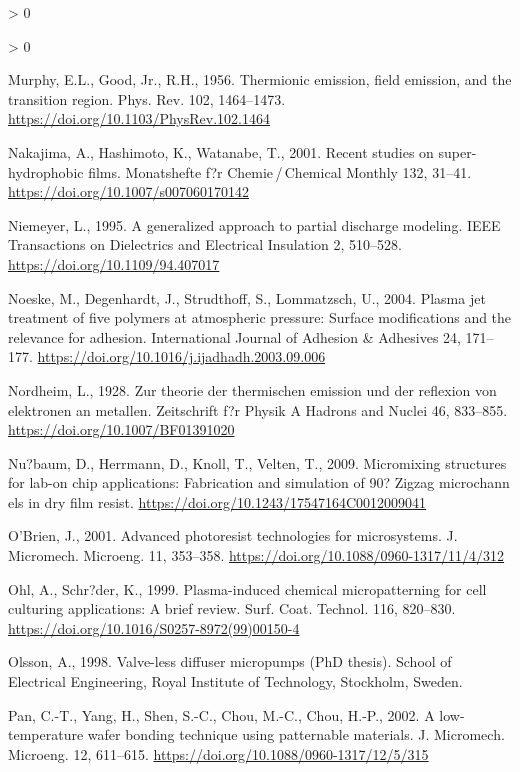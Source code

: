 \documentclass[
  11pt,
  twoside]{article}
\newlength{\cslhangindent}
\newenvironment{CSLReferences}[2] %
 {%
  \setlength{\parindent}{0pt}
  \ifodd #1 \everypar{\setlength{\hangindent}{\cslhangindent}}\ignorespaces\fi
  \ifnum #2 > 0
  \setlength{\parskip}{#2\baselineskip}
  \fi
 }%
 {}
\begin{document}
\begin{CSLReferences}{1}{0}
\begin{CSLReferences}{1}{0}
\leavevmode\hypertarget{ref-Murp1956}{}%
Murphy, E.L., Good, Jr., R.H., 1956. Thermionic emission, field emission, and the transition region. Phys. Rev. 102, 1464--1473. \url{https://doi.org/10.1103/PhysRev.102.1464}

\leavevmode\hypertarget{ref-Naka01}{}%
Nakajima, A., Hashimoto, K., Watanabe, T., 2001. Recent studies on super-hydrophobic films. Monatshefte f?r Chemie / Chemical Monthly 132, 31--41. \url{https://doi.org/10.1007/s007060170142}

\leavevmode\hypertarget{ref-Niem1995}{}%
Niemeyer, L., 1995. A generalized approach to partial discharge modeling. IEEE Transactions on Dielectrics and Electrical Insulation 2, 510--528. \url{https://doi.org/10.1109/94.407017}

\leavevmode\hypertarget{ref-Noes04}{}%
Noeske, M., Degenhardt, J., Strudthoff, S., Lommatzsch, U., 2004. Plasma jet treatment of five polymers at atmospheric pressure: Surface modifications and the relevance for adhesion. International Journal of Adhesion \& Adhesives 24, 171--177. \url{https://doi.org/10.1016/j.ijadhadh.2003.09.006}

\leavevmode\hypertarget{ref-Nord1928}{}%
Nordheim, L., 1928. Zur theorie der thermischen emission und der reflexion von elektronen an metallen. Zeitschrift f?r Physik A Hadrons and Nuclei 46, 833--855. \url{https://doi.org/10.1007/BF01391020}

\leavevmode\hypertarget{ref-Nuss09}{}%
Nu?baum, D., Herrmann, D., Knoll, T., Velten, T., 2009. Micromixing structures for lab-on chip applications: Fabrication and simulation of 90? Zigzag microchann els in dry film resist. \url{https://doi.org/10.1243/17547164C0012009041}

\leavevmode\hypertarget{ref-Obri01}{}%
O'Brien, J., 2001. Advanced photoresist technologies for microsystems. J. Micromech. Microeng. 11, 353--358. \url{https://doi.org/10.1088/0960-1317/11/4/312}

\leavevmode\hypertarget{ref-Ohl1999}{}%
Ohl, A., Schr?der, K., 1999. Plasma-induced chemical micropatterning for cell culturing applications: A brief review. Surf. Coat. Technol. 116, 820--830. \url{https://doi.org/10.1016/S0257-8972(99)00150-4}

\leavevmode\hypertarget{ref-Olss1998}{}%
Olsson, A., 1998. Valve-less diffuser micropumps (PhD thesis). School of Electrical Engineering, Royal Institute of Technology, Stockholm, Sweden.

\leavevmode\hypertarget{ref-Pan02}{}%
Pan, C.-T., Yang, H., Shen, S.-C., Chou, M.-C., Chou, H.-P., 2002. A low-temperature wafer bonding technique using patternable materials. J. Micromech. Microeng. 12, 611--615. \url{https://doi.org/10.1088/0960-1317/12/5/315}


\end{CSLReferences}
\end{CSLReferences}
\end{document}
